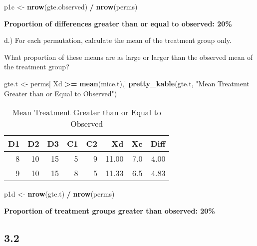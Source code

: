 \documentclass[
  12pt,
]{report}
\newenvironment{Shaded}{\begin{snugshade}}{\end{snugshade}}
\newcommand{\KeywordTok}[1]{\textcolor[rgb]{0.13,0.29,0.53}{\textbf{#1}}}
\newcommand{\NormalTok}[1]{#1}
\newcommand{\OperatorTok}[1]{\textcolor[rgb]{0.81,0.36,0.00}{\textbf{#1}}}
\newcommand{\StringTok}[1]{\textcolor[rgb]{0.31,0.60,0.02}{#1}}
\begin{document}
\begin{Shaded}
\begin{Highlighting}[]
\NormalTok{p1c <-}\StringTok{ }\KeywordTok{nrow}\NormalTok{(gte.observed) }\OperatorTok{/}\StringTok{ }\KeywordTok{nrow}\NormalTok{(perms)}
\end{Highlighting}
\end{Shaded}

\textbf{Proportion of differences greater than or equal to observed:
20\%}

d.) For each permutation, calculate the mean of the treatment group
only.

What proportion of these means are as large or larger than the observed
mean of the treatment group?

\begin{Shaded}
\begin{Highlighting}[]
\NormalTok{gte.t <-}\StringTok{ }\NormalTok{perms[ Xd }\OperatorTok{>=}\StringTok{ }\KeywordTok{mean}\NormalTok{(mice.t),]}
\KeywordTok{pretty_kable}\NormalTok{(gte.t, }\StringTok{"Mean Treatment Greater than or Equal to Observed"}\NormalTok{)}
\end{Highlighting}
\end{Shaded}

\begin{table}[!h]

\caption{\label{tab:unnamed-chunk-5}Mean Treatment Greater than or Equal to Observed}
\centering
\begin{tabular}[t]{r|r|r|r|r|r|r|r}
\hline
D1 & D2 & D3 & C1 & C2 & Xd & Xc & Diff\\
\hline
8 & 10 & 15 & 5 & 9 & 11.00 & 7.0 & 4.00\\
\hline
9 & 10 & 15 & 8 & 5 & 11.33 & 6.5 & 4.83\\
\hline
\end{tabular}
\end{table}

\begin{Shaded}
\begin{Highlighting}[]
\NormalTok{p1d <-}\StringTok{ }\KeywordTok{nrow}\NormalTok{(gte.t) }\OperatorTok{/}\StringTok{ }\KeywordTok{nrow}\NormalTok{(perms)}
\end{Highlighting}
\end{Shaded}

\textbf{Proportion of treatment groups greater than observed: 20\%}

\hypertarget{section-1}{%
\subsection{3.2}\label{section-1}}
\end{document}
